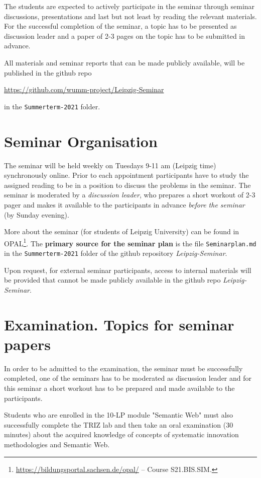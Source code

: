 \documentclass[11pt,a4paper]{article}
\begin{document}
The students are expected to actively participate in the seminar through
seminar discussions, presentations and last but not least by reading the
relevant materials.  For the successful completion of the seminar, a topic has
to be presented as discussion leader and a paper of 2-3 pages on the topic has
to be submitted in advance.

All materials and seminar reports that can be made publicly available, will be
published in the github repo
\begin{center}
  \url{https://github.com/wumm-project/Leipzig-Seminar}
\end{center}
in the \texttt{Summerterm-2021} folder.

\section{Seminar Organisation}

The seminar will be held weekly on Tuesdays 9-11 am (Leipzig time)
synchronously online.  Prior to each appointment participants have to study
the assigned reading to be in a position to discuss the problems in the
seminar.  The seminar is moderated by a \emph{discussion leader}, who prepares
a short workout of 2-3 pager and makes it available to the participants in
advance \emph{before the seminar} (by Sunday evening).

More about the seminar (for students of Leipzig University) can be found in
OPAL\footnote{\url{https://bildungsportal.sachsen.de/opal/} -- Course
  S21.BIS.SIM.}.  The \textbf{primary source for the seminar plan} is the file
\texttt{Seminarplan.md} in the \texttt{Summerterm-2021} folder of the github
repository \emph{Leipzig-Seminar}.

Upon request, for external seminar participants, access to internal materials
will be provided that cannot be made publicly available in the github repo
\emph{Leipzig-Seminar}.

\section{Examination. Topics for seminar papers}

In order to be admitted to the examination, the seminar must be successfully
completed, one of the seminars has to be moderated as discussion leader and
for this seminar a short workout has to be prepared and made available to the
participants.

Students who are enrolled in the 10-LP module "Semantic Web" must also
successfully complete the TRIZ lab and then take an oral examination (30
minutes) about the acquired knowledge of concepts of systematic innovation
methodologies and Semantic Web.
\end{document}
